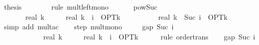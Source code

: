 \begin{isabellebody}
\ {\isacharquery}{\kern0pt}thesis\isanewline
\ \ \ \ \ \ \isamarkupfalse%
\ {\isacharparenleft}{\kern0pt}rule\ mult{\isacharunderscore}{\kern0pt}left{\isacharunderscore}{\kern0pt}mono{\isacharparenright}{\kern0pt}\isanewline
\ \ \isamarkupfalse%
\isanewline
\isanewline
\ \ \isamarkupfalse%
\ pow{\isacharunderscore}{\kern0pt}Suc{\isacharcolon}{\kern0pt}\isanewline
\ \ \ {\isachardoublequoteopen}{\isacharparenleft}{\kern0pt}{}\ {\isacharminus}{\kern0pt}\ {}\ {\isacharslash}{\kern0pt}\ real\ k{\isacharparenright}{\kern0pt}\ {\isacharasterisk}{\kern0pt}\ {\isacharparenleft}{\kern0pt}{\isacharparenleft}{\kern0pt}{}\ {\isacharminus}{\kern0pt}\ {}\ {\isacharslash}{\kern0pt}\ real\ k{\isacharparenright}{\kern0pt}\ {\isacharcircum}{\kern0pt}\ i\ {\isacharasterisk}{\kern0pt}\ OPT{\isacharunderscore}{\kern0pt}k{\isacharparenright}{\kern0pt}\isanewline
\ \ \ \ \ {\isacharequal}{\kern0pt}\ {\isacharparenleft}{\kern0pt}{}\ {\isacharminus}{\kern0pt}\ {}\ {\isacharslash}{\kern0pt}\ real\ k{\isacharparenright}{\kern0pt}\ {\isacharcircum}{\kern0pt}\ Suc\ i\ {\isacharasterisk}{\kern0pt}\ OPT{\isacharunderscore}{\kern0pt}k{\isachardoublequoteclose}\isanewline
\ \ \ \isamarkupfalse%
\ {\isacharparenleft}{\kern0pt}simp\ add{\isacharcolon}{\kern0pt}\ mult{\isacharunderscore}{\kern0pt}ac{\isacharparenright}{\kern0pt}\isanewline
\isanewline
\ \ \isamarkupfalse%
\ step\ mult{\isacharunderscore}{\kern0pt}mono\ \isamarkupfalse%
\isanewline
\ \ \ \ {\isachardoublequoteopen}gap\ {\isacharparenleft}{\kern0pt}Suc\ i{\isacharparenright}{\kern0pt}\isanewline
\ \ \ \ \ \ \ {\isasymle}\ {\isacharparenleft}{\kern0pt}{}\ {\isacharminus}{\kern0pt}\ {}\ {\isacharslash}{\kern0pt}\ real\ k{\isacharparenright}{\kern0pt}\ {\isacharasterisk}{\kern0pt}\ {\isacharparenleft}{\kern0pt}{\isacharparenleft}{\kern0pt}{}\ {\isacharminus}{\kern0pt}\ {}\ {\isacharslash}{\kern0pt}\ real\ k{\isacharparenright}{\kern0pt}\ {\isacharcircum}{\kern0pt}\ i\ {\isacharasterisk}{\kern0pt}\ OPT{\isacharunderscore}{\kern0pt}k{\isacharparenright}{\kern0pt}{\isachardoublequoteclose}\isanewline
\ \ \ \ \isamarkupfalse%
\ {\isacharparenleft}{\kern0pt}rule\ order{\isacharunderscore}{\kern0pt}trans{\isacharparenright}{\kern0pt}\isanewline
\ \ \isamarkupfalse%
\ {\isachardoublequoteopen}gap\ {\isacharparenleft}{\kern0pt}Suc\ i{\isacharparenright}{\kern0pt}\isanewline

\end{isabellebody}
